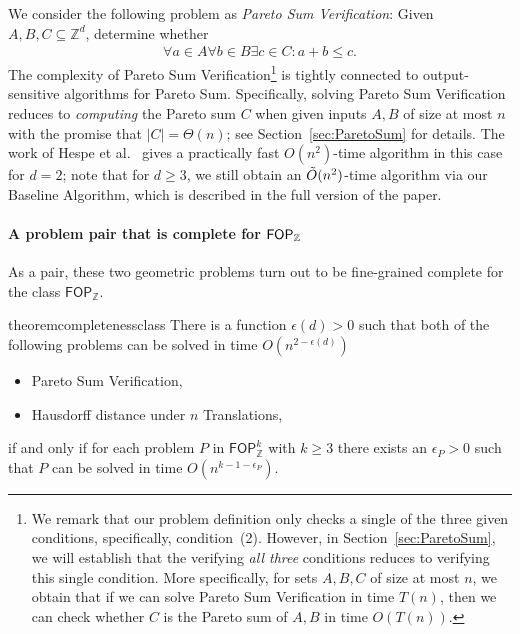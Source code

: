 We consider the following problem as \emph{Pareto Sum Verification}: Given $A,B,C\subseteq \mathbb{Z}^d$, determine whether
\begin{align*}
\forall a \in A \forall b \in B \exists c \in C: a+b \le c.
\end{align*}
The complexity of Pareto Sum Verification\footnote{We remark that our problem definition only checks a single of the three given conditions, specifically, condition~(2). However, in Section~\ref{sec:ParetoSum}, we will establish that the verifying \emph{all three} conditions reduces to verifying this single condition. More specifically, for sets $A,B,C$ of size at most $n$, we obtain that if we can solve Pareto Sum Verification in time $T(n)$, then we can check whether $C$ is the Pareto sum of $A,B$ in time $O(T(n))$.} is tightly connected to output-sensitive algorithms for Pareto Sum. Specifically, solving Pareto Sum Verification reduces to \emph{computing} the Pareto sum $C$ when given inputs $A,B$ of size at most $n$ with the promise that $|C| =\Theta(n)$; see Section~\ref{sec:ParetoSum} for details. The work of Hespe et al.~\cite{DBLP:conf/esa/Hespe0ST23} gives a practically fast $O(n^2)$-time algorithm in this case for $d=2$; note that for $d\ge 3$, we still obtain an $\tilde{O}(n^2)$-time algorithm via our Baseline Algorithm, which is described in the full version of the paper.



\paragraph{A problem pair that is complete for $\mathsf{FOP}_{\mathbb{Z}}$}
As a pair, these two geometric problems turn out to be fine-grained complete for the class $\mathsf{FOP}_{\mathbb{Z}}$.
  \begin{restatable}{theorem}{completenessclass}
	There is a function $\epsilon(d)>0$ such that 
	both of the following problems can be solved in time $O(n^{2-\epsilon(d)})$
	\begin{itemize}
	\item Pareto Sum Verification,
	\item Hausdorff distance under $n$ Translations,
	\end{itemize}
	if and only if for each problem $P$ in $\mathsf{FOP}_{\mathbb{Z}}^k$ with $k\geq3$ there exists an $\epsilon_P>0$ such that $P$ can be solved in time $O(n^{k-1-\epsilon_P})$. 
	\label{completenesswholeFOP3}
	\end{restatable}

